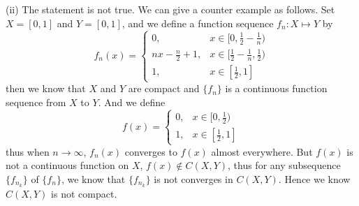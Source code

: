 \documentclass[12pt,a4paper]{ctexart}
\begin{document}
(ii) The statement is not true. We can give a counter example as follows. Set $X = [0, 1]$ and $Y = [0, 1]$, and we define a function sequence $f_{n}: X \mapsto Y$ by
\begin{equation*}
f_{n}(x) =
\left\{
             \begin{array}{cl}
             0, & x \in [0, \frac{1}{2} - \frac{1}{n}) \\
             n x - \frac{n}{2} + 1, & x \in [\frac{1}{2} - \frac{1}{n}, \frac{1}{2}) \\
             1, & x \in [\frac{1}{2}, 1]
             \end{array}
\right.
\end{equation*}
then we know that $X$ and $Y$ are compact and $\{f_{n}\}$ is a continuous function sequence from $X$ to $Y$. And we define
\begin{equation*}
f (x) =
\left\{
             \begin{array}{cl}
             0, & x \in [0, \frac{1}{2}) \\
             1, & x \in [\frac{1}{2}, 1]
             \end{array}
\right.
\end{equation*}
thus when $n \to \infty$, $f_{n}(x)$ converges to $f(x)$ almost everywhere. But $f(x)$ is not a continuous function on $X$, $f(x) \notin C(X, Y)$,
thus for any subsequence $\{f_{n_{k}}\}$ of $\{f_{n}\}$, we know that $\{f_{n_{k}}\}$ is not converges in $C(X, Y)$. Hence we know $C(X, Y)$ is not compact.
\end{document}
